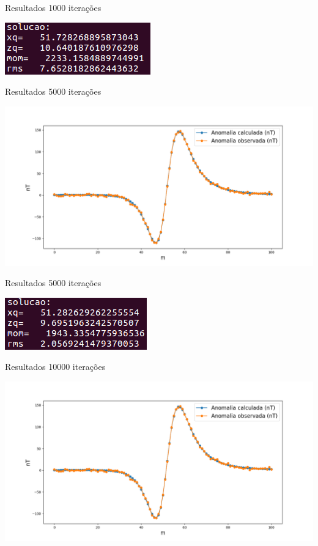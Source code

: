 \documentclass{beamer}
\begin{document}
\begin{frame}{Resultados}
1000 iterações
\begin{center}
\includegraphics[scale=1]{rms_1000}
\end{center}
\end{frame}

\begin{frame}{Resultados}
5000 iterações
\begin{center}
\includegraphics[scale=0.35]{5000iteracoes}
\end{center}
\end{frame}

\begin{frame}{Resultados}
5000 iterações
\begin{center}
\includegraphics[scale=1]{rms_5000}
\end{center}
\end{frame}

\begin{frame}{Resultados}
10000 iterações
\begin{center}
\includegraphics[scale=0.35]{10000iteracoes}
\end{center}
\end{frame}
\end{document}
